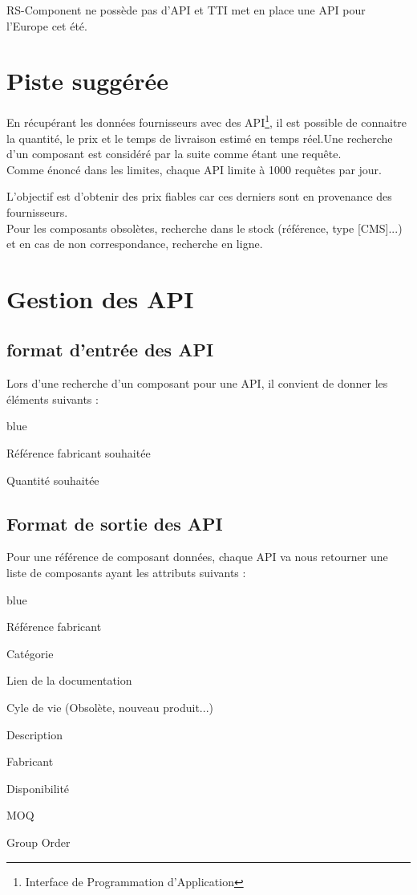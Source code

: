 { RS-Component ne possède pas d'API et TTI met en place une API pour l'Europe cet été.
 
\section{Piste suggérée}

En récupérant les données fournisseurs avec des API\footnote{Interface de Programmation d'Application}, il est possible de connaitre la quantité, le prix et le temps de livraison estimé en temps réel.Une recherche d'un composant est considéré par la suite comme étant une requête.\\

Comme énoncé dans les limites, chaque API limite à 1000 requêtes par jour.

L’objectif est d’obtenir des prix fiables car ces derniers sont en provenance des fournisseurs.\\

Pour les composants obsolètes, recherche dans le stock (référence, type [CMS]...) et en cas de non correspondance, recherche en ligne.


\section{Gestion des API}

\subsection{format d'entrée des API}

Lors d'une recherche d'un composant pour une API, il convient de donner les éléments suivants : 

\begin{items}{blue}{\Bullet}
\item Référence fabricant souhaitée
\item Quantité souhaitée
\end{items}

\subsection{Format de sortie des API}
Pour une référence de composant données, chaque API va nous retourner une liste de composants ayant les attributs suivants : 

\begin{items}{blue}{\Bullet}
\item Référence fabricant
\item Catégorie
\item Lien de la documentation
\item Cyle de vie (Obsolète, nouveau produit...)
\item Description
\item Fabricant
\item Disponibilité
\item MOQ
\item Group Order\\
\end{items}

}
